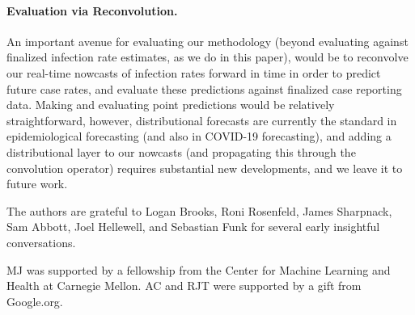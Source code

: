 \documentclass[sts]{imsart}
\theoremstyle{plain}
\theoremstyle{definition}
\theoremstyle{remark}
\begin{document}
\smallskip
\paragraph*{Evaluation via Reconvolution.}

An important avenue for evaluating our methodology (beyond evaluating against
finalized infection rate estimates, as we do in this paper), would be to
reconvolve our real-time nowcasts of infection rates forward in time in order to
predict future case rates, and evaluate these predictions against finalized case
reporting data. Making and evaluating point predictions would be relatively
straightforward, however, distributional forecasts are currently the standard in
epidemiological forecasting (and also in COVID-19 forecasting), and adding a
distributional layer to our nowcasts (and propagating this through the
convolution operator) requires substantial new developments, and we leave it to
future work.

\begin{acks}[Acknowledgments]
The authors are grateful to Logan Brooks, Roni Rosenfeld, James Sharpnack, Sam 
Abbott, Joel Hellewell, and Sebastian Funk for several early insightful
conversations.   
 
MJ was supported by a fellowship from the Center for Machine Learning and 
Health at Carnegie Mellon. AC and RJT were supported by a gift from Google.org.   
\end{acks}


\end{document}
